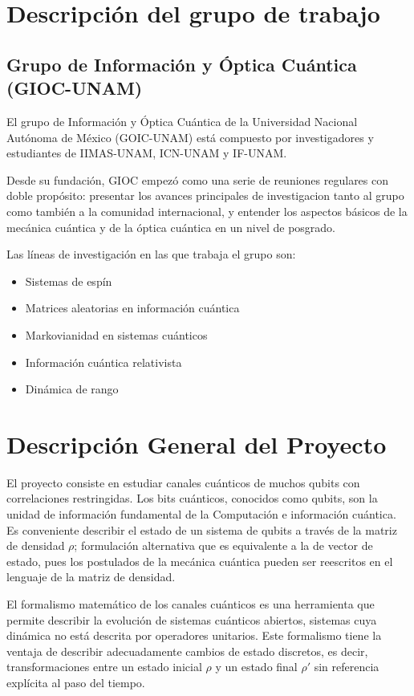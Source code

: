 \documentclass[11pt, spanish, letterpage]{article}
\begin{document}
\section{Descripción del grupo de trabajo}
\subsection{Grupo de Información y Óptica Cuántica (GIOC-UNAM)}
El grupo de Información y Óptica Cuántica de la Universidad Nacional Autónoma de México (GOIC-UNAM) está compuesto por investigadores y estudiantes de IIMAS-UNAM, ICN-UNAM y IF-UNAM. 

Desde su fundación, GIOC empezó como una serie de reuniones regulares con doble propósito: presentar los avances principales de investigacion tanto al grupo como también a la comunidad internacional, y entender los aspectos básicos de la mecánica cuántica y de la óptica cuántica en un nivel de posgrado. 

Las líneas de investigación en las que trabaja el grupo son:
\begin{itemize}
	\item Sistemas de espín
	\item Matrices aleatorias en información cuántica
	\item Markovianidad en sistemas cuánticos
	\item Información cuántica relativista
	\item Dinámica de rango
\end{itemize}

\section{Descripción General del Proyecto}
El proyecto consiste en estudiar canales cuánticos de muchos qubits con correlaciones restringidas. Los bits cuánticos, conocidos como qubits, son la unidad de información fundamental de la Computación e información cuántica. Es conveniente describir el estado de un sistema de qubits a través de la matriz de densidad $\rho$; formulación alternativa que es equivalente a la de vector de estado, pues los postulados de la mecánica cuántica pueden ser reescritos en el lenguaje de la matriz de densidad. 


El formalismo matemático de los canales cuánticos es una herramienta que permite describir la evolución de sistemas cuánticos abiertos, sistemas cuya dinámica no está descrita por operadores unitarios. Este formalismo tiene la ventaja de describir adecuadamente cambios de estado discretos, es decir, transformaciones entre un estado inicial $\rho$ y un estado final $\rho '$ sin referencia explícita al paso del tiempo. 
\end{document}
